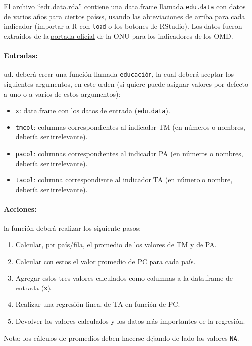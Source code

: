 \documentclass[]{article}
\begin{document}
El archivo ``edu.data.rda'' contiene una data.frame llamada
\texttt{edu.data} con datos de varios años para ciertos países, usando
las abreviaciones de arriba para cada indicador (importar a R con
\texttt{load} o los botones de RStudio). Los datos fueron extraidos de
la \href{http://mdgs.un.org/unsd/mdg/Data.aspx}{portada oficial} de la
ONU para los indicadores de los OMD.

\paragraph{Entradas:}

ud. deberá crear una función llamada \texttt{educación}, la cual deberá
aceptar los siguientes argumentos, en este orden (si quiere puede
asignar valores por defecto a uno o a varios de estos argumentos):

\begin{itemize}
\item
  \texttt{x}: data.frame con los datos de entrada (\texttt{edu.data}).
\item
  \texttt{tmcol}: columnas correspondientes al indicador TM (en números
  o nombres, debería ser irrelevante).
\item
  \texttt{pacol}: columnas correspondientes al indicador PA (en números
  o nombres, debería ser irrelevante).
\item
  \texttt{tacol}: columna correspondiente al indicador TA (en número o
  nombre, debería ser irrelevante).
\end{itemize}
\paragraph{Acciones:}

la función deberá realizar los siguiente pasos:

\begin{enumerate}[1.]
\item
  Calcular, por país/fila, el promedio de los valores de TM y de PA.
\item
  Calcular con estos el valor promedio de PC para cada país.
\item
  Agregar estos tres valores calculados como columnas a la data.frame de
  entrada (\texttt{x}).
\item
  Realizar una regresión lineal de TA en función de PC.
\item
  Devolver los valores calculados y los datos más importantes de la
  regresión.
\end{enumerate}
Nota: los cálculos de promedios deben hacerse dejando de lado los
valores \texttt{NA}.
\end{document}
